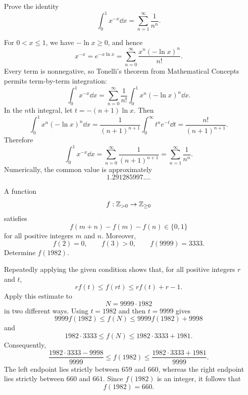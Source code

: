    \begin{expectedproblem}
        Prove the identity
        \[
            \int_0^1 x^{-x}\dd x
            =
            \sum_{n=1}^{\infty}\frac{1}{n^n}.
        \]
    \end{expectedproblem}

    \begin{solution}
        For $0<x\leq1$, we have $-\ln x\geq0$, and hence
        \[
            x^{-x}
            =
            e^{-x\ln x}
            =
            \sum_{n=0}^{\infty}
            \frac{x^n(-\ln x)^n}{n!}.
        \]
        Every term is nonnegative, so Tonelli's theorem from Mathematical
        Concepts permits term-by-term integration:
        \[
            \int_0^1x^{-x}\dd x
            =
            \sum_{n=0}^{\infty}
            \frac{1}{n!}
            \int_0^1x^n(-\ln x)^n\dd x.
        \]
        In the $n$th integral, let $t=-(n+1)\ln x$. Then
        \[
            \int_0^1x^n(-\ln x)^n\dd x
            =
            \frac{1}{(n+1)^{n+1}}
            \int_0^\infty t^ne^{-t}\dd t
            =
            \frac{n!}{(n+1)^{n+1}}.
        \]
        Therefore
        \[
            \int_0^1x^{-x}\dd x
            =
            \sum_{n=0}^{\infty}\frac{1}{(n+1)^{n+1}}
            =
            \boxed{\sum_{n=1}^{\infty}\frac{1}{n^n}}.
        \]
        Numerically, the common value is approximately
        \[
            1.291285997\ldots.
        \]
    \end{solution}

    \begin{expectedproblem}[1982 IMO]
        A function
        \[
            f:\mathbb{Z}_{>0}\to\mathbb{Z}_{\geq0}
        \]
        satisfies
        \[
            f(m+n)-f(m)-f(n)\in\{0,1\}
        \]
        for all positive integers $m$ and $n$. Moreover,
        \[
            f(2)=0,
            \qquad
            f(3)>0,
            \qquad
            f(9999)=3333.
        \]
        Determine $f(1982)$.
    \end{expectedproblem}

    \begin{solution}
        Repeatedly applying the given condition shows that, for all positive
        integers $r$ and $t$,
        \[
            r f(t)
            \leq
            f(rt)
            \leq
            r f(t)+r-1.
        \]
        Apply this estimate to
        \[
            N=9999\cdot1982
        \]
        in two different ways. Using $t=1982$ and then $t=9999$ gives
        \[
            9999f(1982)
            \leq
            f(N)
            \leq
            9999f(1982)+9998
        \]
        and
        \[
            1982\cdot3333
            \leq
            f(N)
            \leq
            1982\cdot3333+1981.
        \]
        Consequently,
        \[
            \frac{1982\cdot3333-9998}{9999}
            \leq
            f(1982)
            \leq
            \frac{1982\cdot3333+1981}{9999}.
        \]
        The left endpoint lies strictly between $659$ and $660$, whereas the
        right endpoint lies strictly between $660$ and $661$. Since
        $f(1982)$ is an integer, it follows that
        \[
            \boxed{f(1982)=660}.
        \]
    \end{solution}

